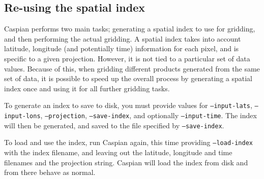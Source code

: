 \documentclass[a4paper,12pt]{article}
\begin{document}
\subsection{Re-using the spatial index}
Caspian performs two main tasks; generating a spatial index to use for gridding, and then performing the actual gridding. A spatial index takes into account latitude, longitude (and potentially time) information for each pixel, and is specific to a given projection. However, it is not tied to a particular set of data values. Because of this, when gridding different products generated from the same set of data, it is possible to speed up the overall process by generating a spatial index once and using it for all further gridding tasks.

To generate an index to save to disk, you must provide values for \texttt{--input-lats}, \texttt{--input-lons}, \texttt{--projection}, \texttt{--save-index}, and optionally \texttt{--input-time}. The index will then be generated, and saved to the file specified by \texttt{--save-index}.

To load and use the index, run Caspian again, this time providing \texttt{--load-index} with the index filename, and leaving out the latitude, longitude and time filenames and the projection string. Caspian will load the index from disk and from there behave as normal.
\end{document}
